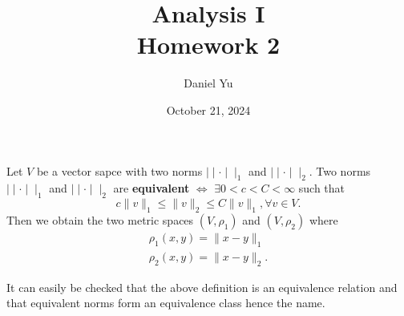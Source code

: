 \documentclass[a4paper]{article}
\title{\Huge{Analysis I}\\ Homework 2}
\author{\huge{Daniel Yu}}
\date{October 21, 2024}
\begin{document}
\maketitle
\newpage%
\pagebreak
\begin{definition}
  Let $V$ be a vector sapce with two norms  $\mid \mid \cdot \mid \mid_{1}$ and $\mid \mid \cdot \mid \mid_{2}$.  Two norms  $\mid \mid \cdot \mid \mid_{1}$ and $\mid \mid \cdot \mid \mid_{2}$ are \textbf{equivalent} $\iff$ $\exists 0 < c < C < \infty$ such that 
  \[
  c \|v\|_{1} \leq \|v\|_{2} \leq C \|v\|_{1}, \forall v \in V 
  .\]Then we obtain the two metric spaces $\left( V, \rho_1 \right) $ and $\left( V, \rho_{2} \right) $ where
  \begin{align*}
    \rho_{1} \left( x,y \right) = \|x-y\|_{1} \\
    \rho_{2} \left( x,y \right) = \|x-y\|_{2}
  .\end{align*}
\end{definition}

\begin{remark}
  It can easily be checked that the above definition is an equivalence relation and that equivalent norms form an equivalence class hence the name.
\end{remark}
\end{document}
